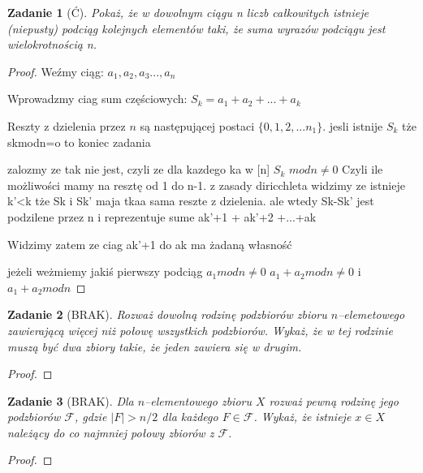 \documentclass{mwbk}
\newtheorem{zad}{Zadanie}[chapter]
\begin{document}
\begin{zad}[Ć]
    Pokaż, że w dowolnym ciągu n liczb całkowitych istnieje (niepusty)
    podciąg kolejnych elementów taki, że suma wyrazów podciągu jest wielokrotnością n.
\end{zad}
\begin{proof}
    Weźmy ciąg: $a_1, a_2, a_3 ..., a_n$

    Wprowadzmy ciag sum częściowych:
    $S_k = a_1 + a_2 + ... + a_k$

    Reszty z dzielenia przez $n$ są następującej postaci
    $\{0, 1, 2, ... n_1\}$.
    jesli istnije $S_k$ tże skmodn=o to koniec zadania

    zalozmy ze tak nie jest, czyli ze dla kazdego ka w [n]
    $S_k$ $mod n  \neq 0$
    Czyli ile możliwości mamy na resztę od 1 do n-1.
    z zasady diricchleta widzimy ze istnieje k'<k tże
    Sk i Sk' maja tkaa sama reszte z dzielenia.
    ale wtedy Sk-Sk' jest podzilene przez n i
    reprezentuje sume ak'+1 + ak'+2 +...+ak

    Widzimy zatem ze ciag ak'+1 do ak ma żadaną własność

    jeżeli weżmiemy jakiś pierwszy podciąg
    $a_1 modn \neq 0$
    $a_1 + a_2 mod n \neq 0$ i $a_1 + a_2 mod n$

\end{proof}





\begin{zad}[BRAK]
    Rozważ dowolną rodzinę podzbiorów zbioru $n$--elemetowego zawierającą
    więcej niż połowę wszystkich podzbiorów. Wykaż, że w tej rodzinie muszą być dwa zbiory
    takie, że jeden zawiera się w drugim.
\end{zad}
\begin{proof}
\end{proof}



\begin{zad}[BRAK]
    Dla $n$--elementowego zbioru $X$ rozważ pewną rodzinę jego podzbiorów
    $\mathcal{F}$, gdzie $|F| > n/2$ dla każdego $F \in \mathcal{F}$. Wykaż, że istnieje
    $x \in X$ należący do co najmniej połowy zbiorów z $\mathcal{F}$.
\end{zad}
\begin{proof}

\end{proof}
\end{document}
